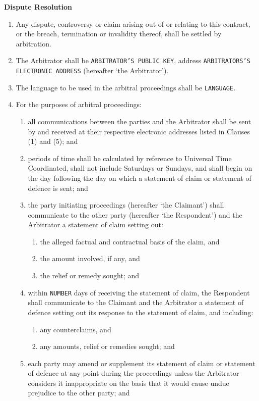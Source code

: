 \documentclass[a4paper,12pt]{article}
\begin{document}
\textbf{Dispute Resolution}

\begin{enumerate}[resume]
	\item Any dispute, controversy or claim arising out of or relating to this contract, or the breach, termination or invalidity thereof, shall be settled by arbitration.
	\item The Arbitrator shall be \texttt{\colorbox{branding}{ARBITRATOR'S PUBLIC KEY}}, address \texttt{\colorbox{branding}{ARBITRATORS'S ELECTRONIC ADDRESS}} (hereafter `the Arbitrator').
	\item The language to be used in the arbitral proceedings shall be \texttt{\colorbox{branding}{LANGUAGE}}.
	\item For the purposes of arbitral proceedings:
	\begin{enumerate}
		\item all communications between the parties and the Arbitrator shall be sent by and received at their respective electronic addresses listed in Clauses (1) and (5); and
		\item periods of time shall be calculated by reference to Universal Time Coordinated, shall not include Saturdays or Sundays, and shall begin on the day following the day on which a statement of claim or statement of defence is sent; and
		\item the party initiating proceedings (hereafter `the Claimant') shall communicate to the other party (hereafter `the Respondent') and the Arbitrator a statement of claim setting out:
		\begin{enumerate}
			\item the alleged factual and contractual basis of the claim, and
			\item the amount involved, if any, and
			\item the relief or remedy sought; and
		\end{enumerate}
		\item within \texttt{\colorbox{branding}{NUMBER}} days of receiving the statement of claim, the Respondent shall communicate to the Claimant and the Arbitrator a statement of defence setting out its response to the statement of claim, and including:
		\begin{enumerate}
			\item any counterclaims, and
			\item any amounts, relief or remedies sought; and
		\end{enumerate}
		\item each party may amend or supplement its statement of claim or statement of defence at any point during the proceedings unless the Arbitrator considers it inappropriate on the basis that it would cause undue prejudice to the other party; and

\end{enumerate}
\end{enumerate}
\end{document}
